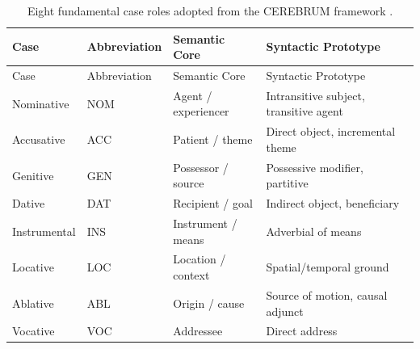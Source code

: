 \documentclass[
]{article}
\begin{document}
\begin{longtable}[]{@{}
  >{\raggedright\arraybackslash}p{}
  >{\centering\arraybackslash}p{}
  >{\raggedright\arraybackslash}p{}
  >{\raggedright\arraybackslash}p{}@{}}
\caption{Eight fundamental case roles adopted from the CEREBRUM
framework
\citep{friedman2024cerebrum}.}\label{tbl:eight-cases}\tabularnewline
\toprule\noalign{}
\begin{minipage}[b]{\linewidth}\raggedright
Case
\end{minipage} & \begin{minipage}[b]{\linewidth}\centering
Abbreviation
\end{minipage} & \begin{minipage}[b]{\linewidth}\raggedright
Semantic Core
\end{minipage} & \begin{minipage}[b]{\linewidth}\raggedright
Syntactic Prototype
\end{minipage} \\
\midrule\noalign{}
\endfirsthead
\toprule\noalign{}
\begin{minipage}[b]{\linewidth}\raggedright
Case
\end{minipage} & \begin{minipage}[b]{\linewidth}\centering
Abbreviation
\end{minipage} & \begin{minipage}[b]{\linewidth}\raggedright
Semantic Core
\end{minipage} & \begin{minipage}[b]{\linewidth}\raggedright
Syntactic Prototype
\end{minipage} \\
\midrule\noalign{}
\endhead
\bottomrule\noalign{}
\endlastfoot
Nominative & NOM & Agent / experiencer & Intransitive subject,
transitive agent \\
Accusative & ACC & Patient / theme & Direct object, incremental theme \\
Genitive & GEN & Possessor / source & Possessive modifier, partitive \\
Dative & DAT & Recipient / goal & Indirect object, beneficiary \\
Instrumental & INS & Instrument / means & Adverbial of means \\
Locative & LOC & Location / context & Spatial/temporal ground \\
Ablative & ABL & Origin / cause & Source of motion, causal adjunct \\
Vocative & VOC & Addressee & Direct address \\
\end{longtable}
\end{document}
